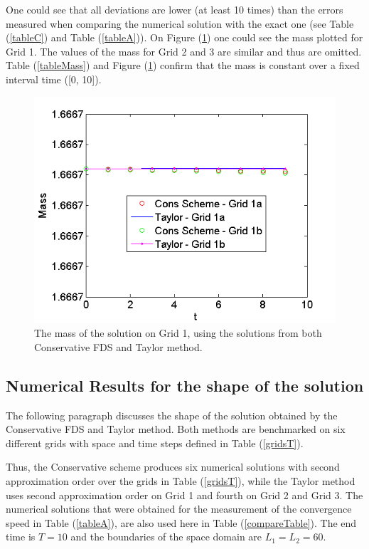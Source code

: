 \documentclass[%
 aip,
cp,  
 amsmath,amssymb,
 reprint,
]{iopconfser}
\newcommand{\rf}[1]{(\ref{#1})}
\begin{document}
One could see that all deviations are lower (at least 10 times) than the errors measured when comparing the numerical solution with the exact one (see Table \rf{tableC} and Table \rf{tableA}). On Figure \rf{massFig} one could see the mass plotted for Grid 1. The values of the mass for Grid 2 and 3 are similar and thus are omitted. Table \rf{tableMass} and Figure \rf{massFig} confirm that the mass is constant over a fixed interval time ([0, 10]).

\begin{figure}[ht]\vspace{0.2cm}
  \centering
  \includegraphics[width=0.5\linewidth]{mass.png}
\caption{The mass of the solution on Grid 1, using the solutions from both Conservative FDS and Taylor method.}
\label{massFig}
\end{figure}

\iffalse
\subsection{Numerical Results for the shape of the solution}

The following paragraph discusses the shape of the solution obtained by the Conservative FDS and Taylor method. Both methods are benchmarked on six different grids with space and time steps defined in Table \rf{gridsT}.

Thus, the Conservative scheme produces six numerical solutions with second approximation order over the grids in Table \rf{gridsT}, while the Taylor method uses second approximation order on Grid 1 and fourth on Grid 2 and Grid 3. The numerical solutions that were obtained for the measurement of the convergence speed in Table \rf{tableA}, are also used here in Table \rf{compareTable}. The end time is $T=10$ and the boundaries of the space domain are $L_1 = L_2 = 60$.
\end{document}
